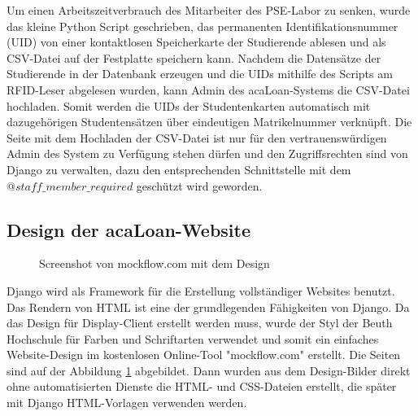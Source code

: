Um einen  Arbeitszeitverbrauch des Mitarbeiter des PSE-Labor zu senken, wurde das kleine Python Script geschrieben, das permanenten Identifikationsnummer (UID) von einer kontaktlosen Speicherkarte der Studierende ablesen und als CSV-Datei auf der Festplatte speichern kann. Nachdem die Datensätze der Studierende in der Datenbank erzeugen und die UIDs mithilfe des Scripts am RFID-Leser abgelesen wurden, kann Admin des acaLoan-Systems die CSV-Datei hochladen. Somit werden die UIDs der Studentenkarten automatisch mit dazugehörigen Studentensätzen über eindeutigen Matrikelnummer verknüpft. Die Seite mit dem Hochladen der CSV-Datei ist nur für den vertrauenswürdigen Admin des System zu Verfügung stehen dürfen und den Zugriffsrechten sind von Django zu verwalten, dazu den entsprechenden Schnittstelle mit dem $@staff\_member\_required$ geschützt wird geworden.

\subsection{Design der acaLoan-Website}
\label{sec:server:design}
\begin{figure}
	\centering
	\caption{Screenshot von mockflow.com mit dem Design}
	\label{fig:design}
\end{figure}
Django wird als Framework für die Erstellung vollständiger Websites benutzt. Das Rendern von HTML ist eine der grundlegenden Fähigkeiten von Django. Da das Design für Display-Client erstellt werden muss, wurde der Styl der Beuth Hochschule für Farben und Schriftarten verwendet und somit ein einfaches Website-Design im kostenlosen Online-Tool "mockflow.com" erstellt. Die Seiten sind auf der Abbildung \ref{fig:design} abgebildet. Dann wurden aus dem Design-Bilder direkt ohne automatisierten Dienste die HTML- und CSS-Dateien erstellt, die später mit Django HTML-Vorlagen verwenden werden.  
